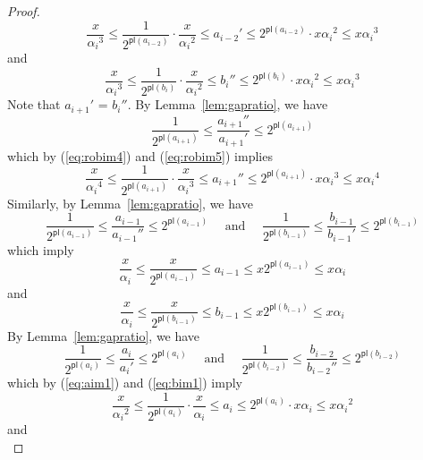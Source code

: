 \documentclass[11pt]{article}
\newcommand{\ens}[1]{\ensuremath{#1}}
\newcommand{\agap}[1]{\ensuremath{a_{#1}}}
\newcommand{\bgap}[1]{\ensuremath{b_{#1}}}
\newcommand{\leftof}[1]{\ensuremath{\gap #1'}}
\newcommand{\rightof}[1]{\ensuremath{\gap #1''}}
\newcommand{\gap}[1]{\ensuremath{#1}}
\newcommand{\potlossa}[1]{\ens{\mathsf{pl}(\agap{#1})}}
\newcommand{\potlossb}[1]{\ens{\mathsf{pl}(\bgap{#1})}}
\newcommand{\maxpotlossa}[1]{\ensuremath{\alpha_{#1}}}
\begin{document}
\begin{proof}
\begin{equation} 
\label{eq:robim4}
\frac{x}{\maxpotlossa i^3}\leq\frac{1}{2^{\potlossa{i-2}}}\cdot\frac{x}{\maxpotlossa i^2} \leq \leftof{a_{i-2}} \leq 2^{\potlossa{i-2}}\cdot x\maxpotlossa i^2 \leq x \maxpotlossa i^3 
\end{equation} 
and 
\begin{equation}
\label{eq:robim5} 
\frac{x}{\maxpotlossa i^3}\leq\frac{1}{2^{\potlossb{i}}}\cdot\frac{x}{\maxpotlossa i^2} \leq \rightof{b_{i}} \leq 2^{\potlossb{i}}\cdot x\maxpotlossa i^2 \leq x \maxpotlossa i^3 
\end{equation} 
Note that \leftof{a_{i+1}} = \rightof{b_{i}}. By Lemma~\ref{lem:gapratio}, we have 
\[ 
\frac{1}{2^{\potlossa{i+1}}} \leq \frac{\rightof{a_{i+1}}}{\leftof{a_{i+1}}} \leq 2^{\potlossa{i+1}} 
\] 
which by (\ref{eq:robim4}) and (\ref{eq:robim5}) implies 
\begin{equation} 
\label{eq:robim6}
\frac{x}{\maxpotlossa i^4}\leq\frac{1}{2^{\potlossa{i+1}}}\cdot\frac{x}{\maxpotlossa i^3}\leq \rightof{a_{i+1}} \leq 2^{\potlossa{i+1}} \cdot x\maxpotlossa i^3  \leq x \maxpotlossa i^4 
\end{equation} 
Similarly, by Lemma~\ref{lem:gapratio}, we have 
\[ 
\frac{1}{2^{\potlossa{i-1}}} \leq \frac{a_{i-1}}{\rightof{a_{i-1}}} \leq 2^{\potlossa{i-1}} 
\quad \mbox{ and }\quad 
\frac{1}{2^{\potlossb{i-1}}} \leq \frac{b_{i-1}}{\leftof{b_{i-1}}} \leq 2^{\potlossb{i-1}} 
\] 
which imply 
\begin{equation} 
\label{eq:aim1} 
\frac{x}{\maxpotlossa i}\leq\frac{x}{2^{\potlossa{i-1}}} \leq a_{i-1} \leq x2^{\potlossa{i-1}} \leq x \maxpotlossa i 
\end{equation} 
and 
\begin{equation} 
\label{eq:bim1} 
\frac{x}{\maxpotlossa i}\leq\frac{x}{2^{\potlossb{i-1}}} \leq b_{i-1} \leq x2^{\potlossb{i-1}} \leq x \maxpotlossa i 
\end{equation} 
By Lemma~\ref{lem:gapratio}, we have 
\[ 
\frac{1}{2^{\potlossa{i}}} \leq \frac{a_{i}}{\leftof{a_{i}}} \leq 2^{\potlossa{i}} 
\quad \mbox{ and }\quad 
\frac{1}{2^{\potlossb{i-2}}} \leq \frac{b_{i-2}}{\rightof{b_{i-2}}} \leq 2^{\potlossb{i-2}} 
\] 
which by (\ref{eq:aim1}) and (\ref{eq:bim1}) imply 
\begin{equation} 
\label{eq:ai} 
\frac{x}{\maxpotlossa i^2}\leq\frac{1}{2^{\potlossa{i}}}\cdot\frac{x}{\maxpotlossa i}\leq a_{i} \leq 2^{\potlossa{i}} \cdot x\maxpotlossa i  \leq x \maxpotlossa i^2 
\end{equation} 
and 
\begin{equation} 

\end{equation}
\end{proof}
\end{document}
